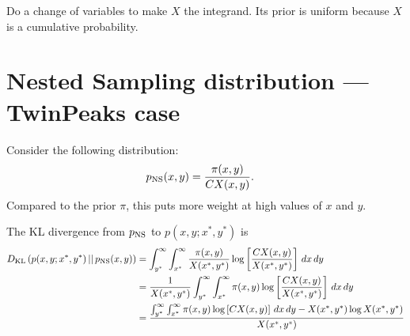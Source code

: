 \documentclass[a4paper, 12pt]{article}
\begin{document}
Do a change of variables to make $X$ the integrand. Its prior is uniform
because $X$ is a cumulative probability.

\section{Nested Sampling distribution --- TwinPeaks case}

Consider the following distribution:
\begin{align}
p_{\rm NS}(x, y) &= \frac{\pi(x, y)}{C X(x, y)}.
\end{align}
Compared to the prior $\pi$, this puts more weight at high values of
$x$ and $y$.

The KL divergence from $p_{\rm NS}$ to $p(x, y ; x^*, y^*)$ is
\begin{align}
D_{\rm KL}\left(p(x, y; x^*, y^*) \,||\, p_{\rm NS}(x, y)\right)
&=
\int_{y^*}^{\infty} \int_{x^*}^{\infty}
    \frac{\pi(x, y)}{X(x^*, y^*)}
    \log \left[\frac{C X(x, y)}{X(x^*, y^*)}\right]
    \, dx \, dy \\
&=
\frac{1}{X(x^*, y^*)}
\int_{y^*}^{\infty} \int_{x^*}^{\infty}
    \pi(x, y)
    \log \left[\frac{C X(x, y)}{X(x^*, y^*)}\right]
    \, dx \, dy \\
&=
\frac{\int_{y^*}^{\infty} \int_{x^*}^{\infty}
     \pi(x, y)
     \log \left[C X(x, y)\right]
     \, dx \, dy - X(x^*, y^*)\log X(x^*, y^*)}
     {X(x^*, y^*)}
\end{align}
\end{document}
